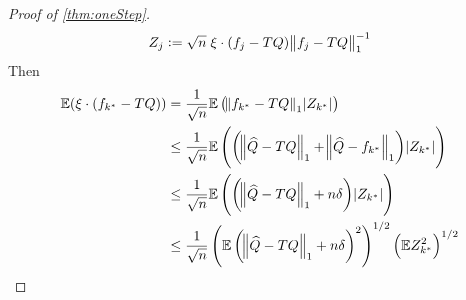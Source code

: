 \begin{proof}[Proof of \cref{thm:oneStep}]
\begin{equation}
  Z_j := \sqrt{n} \; \xi \cdot (f_j - TQ) \norm{f_j - TQ}_1^{-1}
  \end{equation}
  Then
  \begin{align*}
    \mathbb{E} ( \xi \cdot (f_{k^*} - TQ) )
    &= \frac{1}{\sqrt{n}} \mathbb{E} \left( \norm{f_{k^*} - TQ}_1 \abs{Z_{k^*}} \right)
    \\ &\leq \frac{1}{\sqrt{n}}
    \mathbb{E} \left( \left(\norm{\widehat{Q} -TQ}_1 + \norm{\widehat{Q} - f_{k^*}}_1 \right)
    \abs{Z_{k^*}} \right)
    \\ &\leq \frac{1}{\sqrt{n}}
    \mathbb{E} \left( \left(\norm{\widehat{Q} -TQ}_1 + n \delta \right)
    \abs{Z_{k^*}} \right)
    \\ &\leq \frac{1}{\sqrt{n}}
    \left( \mathbb{E} \left(\norm{\widehat{Q} -TQ}_1 + n \delta \right)^2 \right)^{1/2}
    \left( \mathbb{E} Z_{k^*}^2 \right)^{1/2}
  \end{align*}


\end{proof}


